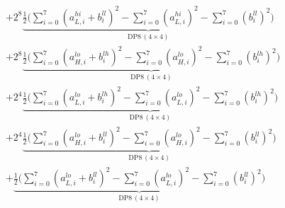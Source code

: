 \documentclass[fleqn]{article}
\newcommand{\DPop}[3]{\mathrm{DP#1}\,(#2\!\times\!#3)}
\begin{document}
\begin{align*}
  & + 2^{8}\underbrace{\tfrac{1}{2}\Big(\sum_{i=0}^{7}(a_{L,i}^{hi}{+}b_i^{ll})^2 - \sum_{i=0}^{7}(a_{L,i}^{hi})^2 - \sum_{i=0}^{7}(b_i^{ll})^2\Big)}_{\DPop{8}{4}{4}} \\[0.7em]
  & + 2^{8}\underbrace{\tfrac{1}{2}\Big(\sum_{i=0}^{7}(a_{H,i}^{lo}{+}b_i^{lh})^2 - \sum_{i=0}^{7}(a_{H,i}^{lo})^2 - \sum_{i=0}^{7}(b_i^{lh})^2\Big)}_{\DPop{8}{4}{4}} \\[0.7em]
  & + 2^{4}\underbrace{\tfrac{1}{2}\Big(\sum_{i=0}^{7}(a_{L,i}^{lo}{+}b_i^{lh})^2 - \sum_{i=0}^{7}(a_{L,i}^{lo})^2 - \sum_{i=0}^{7}(b_i^{lh})^2\Big)}_{\DPop{8}{4}{4}} \\[0.7em]
  & + 2^{4}\underbrace{\tfrac{1}{2}\Big(\sum_{i=0}^{7}(a_{H,i}^{lo}{+}b_i^{ll})^2 - \sum_{i=0}^{7}(a_{H,i}^{lo})^2 - \sum_{i=0}^{7}(b_i^{ll})^2\Big)}_{\DPop{8}{4}{4}} \\[0.7em]
  & + \underbrace{\tfrac{1}{2}\Big(\sum_{i=0}^{7}(a_{L,i}^{lo}{+}b_i^{ll})^2 - \sum_{i=0}^{7}(a_{L,i}^{lo})^2 - \sum_{i=0}^{7}(b_i^{ll})^2\Big)}_{\DPop{8}{4}{4}}
\end{align*}
\end{document}
